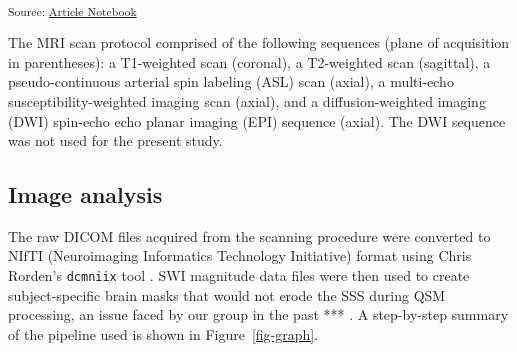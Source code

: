 \documentclass[
true
]{sn-jnl}
\begin{document}
\textsubscript{Source:
\href{https://WeberLab.github.io/Chisep_CSVO2_Manuscript/index.qmd.html}{Article
Notebook}}

The MRI scan protocol comprised of the following sequences (plane of
acquisition in parentheses): a T1-weighted scan (coronal), a T2-weighted
scan (sagittal), a pseudo-continuous arterial spin labeling (ASL) scan
\citep{alsopRecommendedImplementationArterial2015} (axial), a multi-echo
susceptibility-weighted imaging scan
\citep{denkSusceptibilityWeightedImaging2010} (axial), and a
diffusion-weighted imaging (DWI) spin-echo echo planar imaging (EPI)
sequence (axial). The DWI sequence was not used for the present study.

\subsection{Image analysis}\label{image-analysis}

The raw DICOM files acquired from the scanning procedure were converted
to NIfTI (Neuroimaging Informatics Technology Initiative) format using
Chris Rorden's \texttt{dcmniix} tool
\citep{liFirstStepNeuroimaging2016}. SWI magnitude data files were then
used to create subject-specific brain masks that would not erode the SSS
during QSM processing, an issue faced by our group in the past *** . A
step-by-step summary of the pipeline used is shown in
Figure~\ref{fig-graph}.
\end{document}
